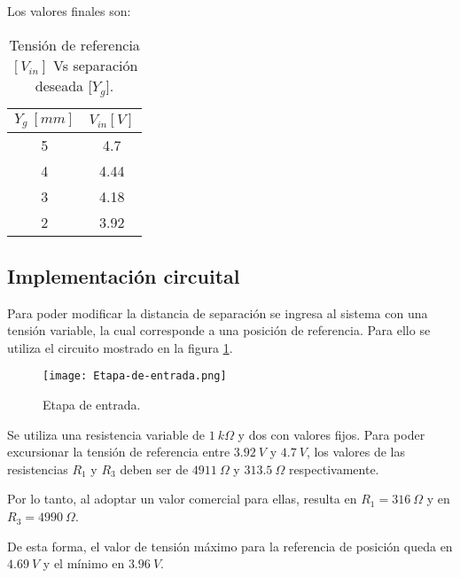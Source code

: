 \noindent Los valores finales son:


\begin{table}[H]
	\begin{center}
		\begin{tabular}{| c | c |}
			\hline
			$Y_g\:[mm]$ & $V_{in}[V]$\\ \hline
			5 & 4.7\\ \hline
			4 & 4.44 \\ \hline
			3 & 4.18\\ \hline
			2 &	3.92 \\ \hline		
		\end{tabular}
		\caption{Tensión de referencia $[V_{in}]$ Vs separación deseada [$Y_g$].}
		\label{tension-ref-vs-separacion-deseada}
	\end{center}
\end{table}

\subsection{Implementación circuital}

\noindent Para poder modificar la distancia de separación se ingresa al sistema con una tensión variable, la cual corresponde a una posición de referencia. Para ello se utiliza el circuito mostrado en la figura \ref{fig:etapa-de-entrada}.

\begin{figure}[H]
	\centering
	\texttt{[image: Etapa-de-entrada.png]}
	\caption{ Etapa de entrada.}
	\label{fig:etapa-de-entrada}
\end{figure}

 
 \noindent Se utiliza una resistencia variable de $1\:k\Omega$ y dos con valores fijos. Para poder excursionar la tensión de referencia entre $3.92\:V$ y $4.7\:V$, los valores de las resistencias $R_1$ y $R_3$ deben ser de $4911\:\Omega$ y $313.5\:\Omega$ respectivamente. 
 
\noindent Por lo tanto, al adoptar un valor comercial para ellas, resulta en $R_1 = 316 \:\Omega$ y en $R_3 = 4990 \:\Omega$.
 
\noindent De esta forma, el valor de tensión máximo para la referencia de posición queda en $4.69\:V$ y el mínimo en $3.96\:V$.
 
